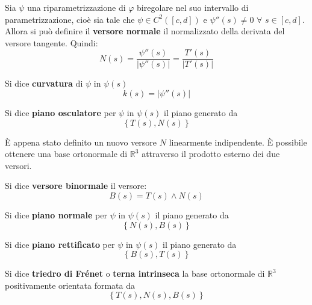 \begin{definition}
    Sia $\psi$ una riparametrizzazione di $\varphi$ biregolare nel suo intervallo di parametrizzazione, cioè sia tale che $\psi \in C^2([c,d])$ e $\psi''(s) \neq 0$ $\forall$ $s \in [c,d]$. Allora si può definire il \textbf{versore normale} il normalizzato della derivata del versore tangente. Quindi:
    \begin{equation}
        N(s)=\frac{\psi''(s)}{|\psi''(s)|}=\frac{T'(s)}{|T'(s)|}
    \end{equation}
\end{definition}
\begin{definition}
    Si dice \textbf{curvatura} di $\psi$ in $\psi(s)$ 
    \begin{equation}
        k(s)= |\psi''(s)|
    \end{equation}
\end{definition}
\begin{definition}
    Si dice \textbf{piano osculatore} per $\psi$ in $\psi(s)$ il piano generato da 
    \begin{equation}
        \left\{T(s), N(s)\right\}
    \end{equation} 
\end{definition}
È appena stato definito un nuovo versore $N$ linearmente indipendente. È possibile ottenere una base ortonormale di $\mathbb{R}^3$ attraverso il prodotto esterno dei due versori.
\begin{definition}
    Si dice \textbf{versore binormale} il versore:
    \begin{equation}
        B(s)=T(s) \wedge N(s)
    \end{equation}
\end{definition}
\begin{definition}
    Si dice \textbf{piano normale} per $\psi$ in $\psi(s)$ il piano generato da
    \begin{equation}
        \left\{N(s), B(s)\right\}
    \end{equation}
\end{definition}
\newpage
\begin{definition}
    Si dice \textbf{piano rettificato} per $\psi$ in $\psi(s)$ il piano generato da
    \begin{equation}
        \left\{ B(s), T(s) \right\}
    \end{equation}
\end{definition}
\begin{definition}
    Si dice \textbf{triedro di Frénet} o \textbf{terna intrinseca} la base ortonormale di $\mathbb{R}^3$ positivamente orientata formata da
    \begin{equation}
        \left\{T(s), N(s), B(s)\right\}
    \end{equation}
\end{definition}
